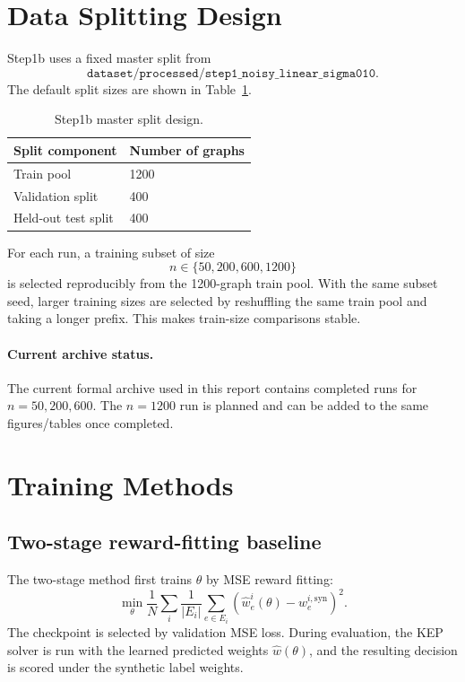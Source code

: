 \documentclass[11pt]{article}
\begin{document}
\section{Data Splitting Design}

Step1b uses a fixed master split from
\[
\texttt{dataset/processed/step1\_noisy\_linear\_sigma010}.
\]
The default split sizes are shown in Table~\ref{tab:step1b-split}.

\begin{table}[h]
\centering
\caption{Step1b master split design.}
\label{tab:step1b-split}
\begin{tabular}{ll}
\toprule
Split component & Number of graphs \\
\midrule
Train pool & 1200 \\
Validation split & 400 \\
Held-out test split & 400 \\
\bottomrule
\end{tabular}
\end{table}

For each run, a training subset of size
\[
    n \in \{50, 200, 600, 1200\}
\]
is selected reproducibly from the 1200-graph train pool. With the same subset
seed, larger training sizes are selected by reshuffling the same train pool and
taking a longer prefix. This makes train-size comparisons stable.

\paragraph{Current archive status.}
The current formal archive used in this report contains completed runs for
\(n=50,200,600\). The \(n=1200\) run is planned and can be added to the same
figures/tables once completed.

\section{Training Methods}

\subsection{Two-stage reward-fitting baseline}

The two-stage method first trains \(\theta\) by MSE reward fitting:
\[
    \min_{\theta}
    \frac{1}{N}\sum_i
    \frac{1}{|E_i|}
    \sum_{e\in E_i}
    \left(\hat w^i_e(\theta)-w^{i,\mathrm{syn}}_e\right)^2.
\]
The checkpoint is selected by validation MSE loss. During evaluation, the KEP
solver is run with the learned predicted weights \(\hat w(\theta)\), and the
resulting decision is scored under the synthetic label weights.
\end{document}
